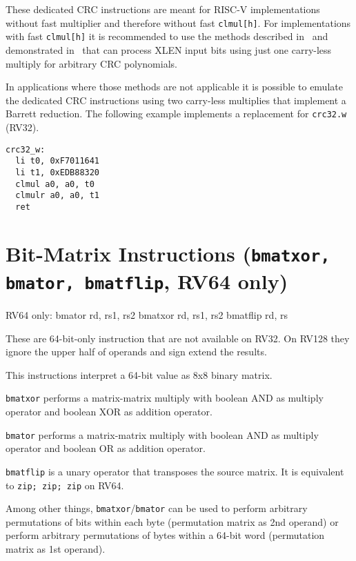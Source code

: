 These dedicated CRC instructions are meant for RISC-V implementations without fast multiplier
and therefore without fast \texttt{clmul[h]}. For implementations with fast \texttt{clmul[h]}
it is recommended to use the methods described in~\cite{FastCRC} and demonstrated in~\cite{Wolf18A}
that can process XLEN input bits using just one carry-less multiply for arbitrary CRC polynomials.

In applications where those methods are not applicable it is possible to emulate the dedicated CRC
instructions using two carry-less multiplies that implement a Barrett reduction. The following example
implements a replacement for \texttt{crc32.w} (RV32).

\begin{minipage}{\linewidth}
\begin{verbatim}
crc32_w:
  li t0, 0xF7011641
  li t1, 0xEDB88320
  clmul a0, a0, t0
  clmulr a0, a0, t1
  ret
\end{verbatim}
\end{minipage}


\section{Bit-Matrix Instructions (\texttt{bmatxor, bmator, bmatflip}, RV64 only)}

\begin{rvb}
  RV64 only:
    bmator rd, rs1, rs2
    bmatxor rd, rs1, rs2
    bmatflip rd, rs
\end{rvb}

These are 64-bit-only instruction that are not available on RV32. On RV128 they
ignore the upper half of operands and sign extend the results.

This instructions interpret a 64-bit value as 8x8 binary matrix.

\texttt{bmatxor} performs a matrix-matrix multiply with boolean AND as multiply
operator and boolean XOR as addition operator.

\texttt{bmator} performs a matrix-matrix multiply with boolean AND as multiply
operator and boolean OR as addition operator.

\texttt{bmatflip} is a unary operator that transposes the source matrix. It is
equivalent to \texttt{zip; zip; zip} on RV64.



Among other things, \texttt{bmatxor}/\texttt{bmator} can be used to perform
arbitrary permutations of bits within each byte (permutation matrix as 2nd
operand) or perform arbitrary permutations of bytes within a 64-bit word
(permutation matrix as 1st operand).

